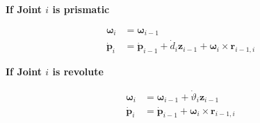 \documentclass[10pt]{article}
\begin{document}
\textbf{If Joint $i$ is prismatic }

$$
\begin{aligned}
\boldsymbol{\omega}_{i} & =\boldsymbol{\omega}_{i-1} \\
\dot{\boldsymbol{p}}_{i} & =\dot{\boldsymbol{p}}_{i-1}+\dot{d}_{i} \boldsymbol{z}_{i-1}+\boldsymbol{\omega}_{i} \times \boldsymbol{r}_{i-1, i}
\end{aligned}
$$

\textbf{If Joint $i$ is revolute}

$$
\begin{aligned}
\boldsymbol{\omega}_{i} & =\boldsymbol{\omega}_{i-1}+\dot{\vartheta}_{i} \boldsymbol{z}_{i-1} \\
\dot{\boldsymbol{p}}_{i} & =\dot{\boldsymbol{p}}_{i-1}+\boldsymbol{\omega}_{i} \times \boldsymbol{r}_{i-1, i}
\end{aligned}
$$
\end{document}
